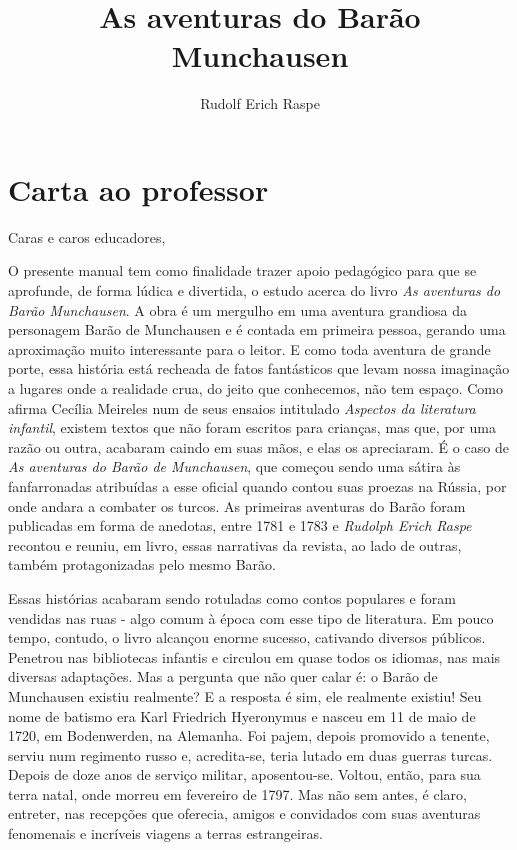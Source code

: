 \documentclass[11pt]{extarticle}
\newcommand{\AutorLivro}{Rudolf Erich Raspe}
\newcommand{\TituloLivro}{As aventuras do Barão Munchausen}
\newcommand{\colaborador}{Gabriela Karam}
\begin{document}
\title{\TituloLivro}
\author{\AutorLivro}
\def\authornotes{\colaborador}

\date{}
\maketitle


\tableofcontents

\section{Carta ao professor}
Caras e caros educadores,

O presente manual tem como finalidade trazer apoio pedagógico para que se aprofunde, de forma lúdica e divertida, o estudo acerca do livro \textit{As aventuras do Barão Munchausen}. A obra é um mergulho em uma aventura grandiosa da personagem Barão de Munchausen e é contada em primeira pessoa, gerando uma aproximação muito interessante para o leitor. E como toda aventura de grande porte, essa história está recheada de fatos fantásticos que levam nossa imaginação a lugares onde a realidade crua, do jeito que conhecemos, não tem espaço. Como afirma Cecília Meireles num de seus ensaios intitulado \textit{Aspectos da literatura infantil}, existem textos que não foram escritos para crianças, mas que, por uma razão ou outra, acabaram caindo em suas mãos, e elas os apreciaram. É o caso de \textit{As aventuras do Barão de Munchausen}, que começou sendo uma sátira às fanfarronadas atribuídas a esse oficial quando contou suas proezas na Rússia, por onde andara a combater os turcos. As primeiras aventuras do Barão foram publicadas em forma de anedotas, entre 1781 e 1783 e \textit{Rudolph Erich Raspe} recontou e reuniu, em livro, essas narrativas da revista, ao lado de outras, também protagonizadas pelo mesmo Barão. 

Essas histórias acabaram sendo rotuladas como contos populares e foram vendidas nas ruas - algo comum à época com esse tipo de literatura. Em pouco tempo, contudo, o livro alcançou enorme sucesso, cativando diversos públicos. Penetrou nas bibliotecas infantis e circulou em quase todos os idiomas, nas mais diversas adaptações. Mas a pergunta que não quer calar é: o Barão de Munchausen existiu realmente? E a resposta é sim, ele realmente existiu! Seu nome de batismo era Karl Friedrich Hyeronymus e nasceu em 11 de maio de 1720, em Bodenwerden, na Alemanha. Foi pajem, depois promovido a tenente, serviu num regimento russo e, acredita-se, teria lutado em duas guerras turcas. Depois de doze anos de serviço militar, aposentou-se. Voltou, então, para sua terra natal, onde morreu em fevereiro de 1797. Mas não sem antes, é claro, entreter, nas recepções que oferecia, amigos e convidados com suas aventuras fenomenais e incríveis viagens a terras estrangeiras. 
\end{document}
